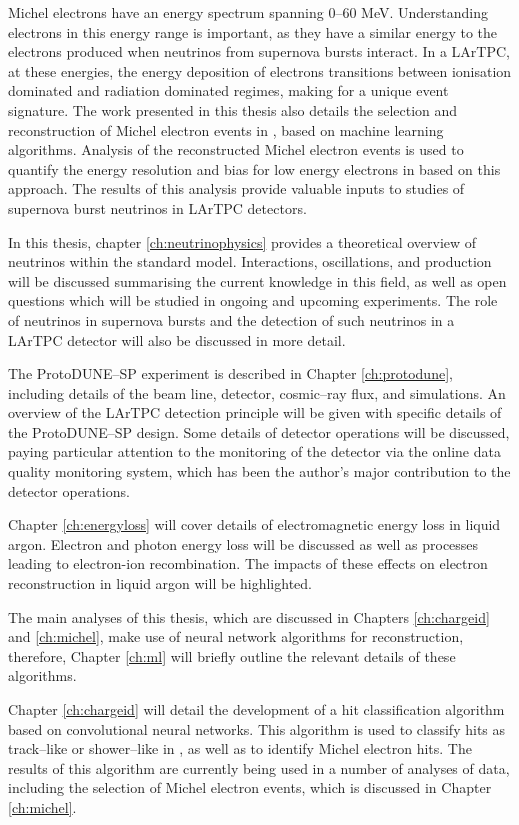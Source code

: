 Michel electrons have an energy spectrum spanning 0--60 MeV. Understanding
electrons in this energy range is important, as they have a similar energy to 
the electrons produced when neutrinos from supernova bursts interact. In a 
LArTPC, at these energies, the energy deposition of electrons transitions 
between ionisation dominated and radiation dominated regimes, making for a 
unique event signature. The work presented in this thesis also details the 
selection and reconstruction of Michel electron events in \protodune{}, based 
on machine learning algorithms. Analysis of the reconstructed Michel electron 
events is used to quantify the energy resolution and bias for low energy 
electrons in \protodune{} based on this approach. The results of this analysis 
provide valuable inputs to studies of supernova burst neutrinos in LArTPC 
detectors.

In this thesis, chapter \ref{ch:neutrinophysics} provides a theoretical 
overview of neutrinos within the standard model. Interactions, oscillations, 
and production will be discussed summarising the current knowledge in this
field, as well as open questions which will be studied in ongoing and upcoming 
experiments. The role of neutrinos in supernova bursts and the detection of 
such neutrinos in a LArTPC detector will also be discussed in more detail.

The ProtoDUNE--SP experiment is described in Chapter \ref{ch:protodune},
including details of the beam line, detector, cosmic--ray flux, and simulations.
An overview of the LArTPC detection principle will be given with specific
details of the ProtoDUNE--SP design. Some details of detector operations will be
discussed, paying particular attention to the monitoring of the detector via the
online data quality monitoring system, which has been the author's major 
contribution to the detector operations.

Chapter \ref{ch:energyloss} will cover details of electromagnetic energy loss
in liquid argon. Electron and photon energy loss will be discussed as well as
processes leading to electron-ion recombination. The impacts of these effects on
electron reconstruction in liquid argon will be highlighted.

The main analyses of this thesis, which are discussed in Chapters 
\ref{ch:chargeid} and \ref{ch:michel}, make use of neural network algorithms 
for reconstruction, therefore, Chapter \ref{ch:ml} will briefly outline the 
relevant details of these algorithms.

Chapter \ref{ch:chargeid} will detail the development of a hit classification
algorithm based on convolutional neural networks. This algorithm is used to
classify hits as track--like or shower--like in \protodune{}, as well as to 
identify Michel electron hits. The results of this algorithm are currently being
used in a number of analyses of \protodune{} data, including the selection of 
Michel electron events, which is discussed in Chapter \ref{ch:michel}.


